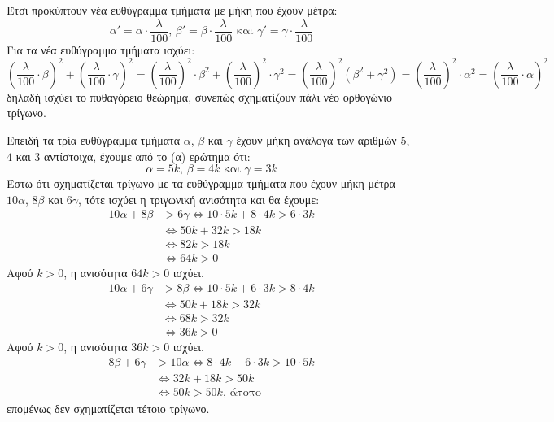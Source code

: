\begin{alist}
Έτσι προκύπτουν νέα ευθύγραμμα τμήματα με μήκη που έχουν μέτρα:
\[ \alpha' = \alpha \cdot \frac{\lambda}{100} \text{, } \beta' = \beta \cdot \frac{\lambda}{100} \text{ και } \gamma' = \gamma \cdot \frac{\lambda}{100} \]
Για τα νέα ευθύγραμμα τμήματα ισχύει:
\[ \left(\frac{\lambda}{100} \cdot \beta\right)^2 + \left(\frac{\lambda}{100} \cdot \gamma\right)^2 = \left(\frac{\lambda}{100}\right)^2 \cdot \beta^2 + \left(\frac{\lambda}{100}\right)^2 \cdot \gamma^2 = \left(\frac{\lambda}{100}\right)^2 (\beta^2 + \gamma^2) = \left(\frac{\lambda}{100}\right)^2 \cdot \alpha^2 = \left(\frac{\lambda}{100} \cdot \alpha\right)^2 \]
δηλαδή ισχύει το πυθαγόρειο θεώρημα, συνεπώς σχηματίζουν πάλι νέο ορθογώνιο τρίγωνο.
\item [Γ)] Επειδή τα τρία ευθύγραμμα τμήματα $\alpha$, $\beta$ και $\gamma$ έχουν μήκη ανάλογα των αριθμών $5$, $4$ και $3$ αντίστοιχα, έχουμε από το (α) ερώτημα ότι:
\[ \alpha = 5k \text{, } \beta = 4k \text{ και } \gamma = 3k \]
Έστω ότι σχηματίζεται τρίγωνο με τα ευθύγραμμα τμήματα που έχουν μήκη μέτρα $10\alpha$, $8\beta$ και $6\gamma$, τότε ισχύει η τριγωνική ανισότητα και θα έχουμε:
\begin{align*}
10\alpha + 8\beta &> 6\gamma \iff 10 \cdot 5k + 8 \cdot 4k > 6 \cdot 3k \\
&\iff 50k + 32k > 18k \\
&\iff 82k > 18k \\
&\iff 64k > 0
\end{align*}
Αφού $k > 0$, η ανισότητα $64k > 0$ ισχύει.
\begin{align*}
10\alpha + 6\gamma &> 8\beta \iff 10 \cdot 5k + 6 \cdot 3k > 8 \cdot 4k \\
&\iff 50k + 18k > 32k \\
&\iff 68k > 32k \\
&\iff 36k > 0
\end{align*}
Αφού $k > 0$, η ανισότητα $36k > 0$ ισχύει.
\begin{align*}
8\beta + 6\gamma &> 10\alpha \iff 8 \cdot 4k + 6 \cdot 3k > 10 \cdot 5k \\
&\iff 32k + 18k > 50k \\
&\iff 50k > 50k \text{, άτοπο}
\end{align*}
επομένως δεν σχηματίζεται τέτοιο τρίγωνο.
\end{alist}